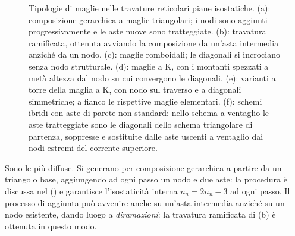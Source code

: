 \begin{figure}[!htbp]
{}
	\caption{Tipologie di maglie nelle travature reticolari
		piane isostatiche.
		(a): composizione gerarchica a maglie
		triangolari; i nodi sono aggiunti progressivamente
		e le aste nuove sono tratteggiate.
		(b): travatura ramificata, ottenuta
		avviando la composizione da un'asta intermedia
		anziché da un nodo.
		(c): maglie romboidali; le diagonali
		si incrociano senza nodo strutturale.
		(d): maglie a K, con i montanti spezzati
		a metà altezza dal nodo su cui convergono
		le diagonali.
		(e): varianti a torre della maglia a K,
		con nodo sul traverso e a diagonali simmetriche;
		a fianco le rispettive maglie elementari.
		(f): schemi ibridi con aste di parete
		non standard: nello schema a ventaglio le aste
		tratteggiate sono le diagonali dello schema
		triangolare di partenza, soppresse e sostituite
		dalle aste uscenti a ventaglio dai nodi estremi
		del corrente superiore.}
	\label{fig:tipologie_maglie}
\end{figure}



Sono le più diffuse. Si generano per composizione
gerarchica a partire da un triangolo base, aggiungendo
ad ogni passo un nodo e due aste: la procedura è
discussa nel 
() e garantisce
l'isostaticità interna $n_a = 2n_n - 3$ ad ogni
passo. Il processo di aggiunta può avvenire anche
su un'asta intermedia anziché su un nodo esistente,
dando luogo a \emph{diramazioni}: la travatura
ramificata di (b) è
ottenuta in questo modo.

